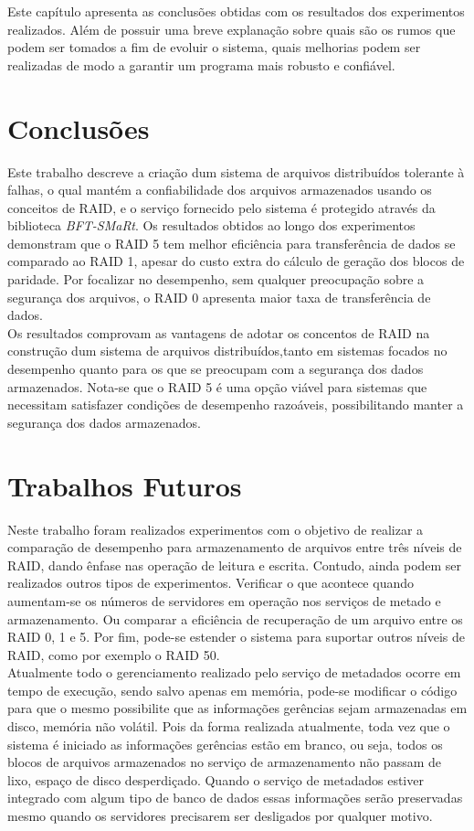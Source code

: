 Este capítulo apresenta as conclusões obtidas com os resultados dos experimentos realizados. Além de possuir uma breve explanação sobre quais são os rumos que podem ser tomados a fim de evoluir o sistema, quais melhorias podem ser realizadas de modo a garantir um programa mais robusto e confiável.
\\

\section{Conclusões}
Este trabalho descreve a criação dum sistema de arquivos distribuídos tolerante à falhas, o qual mantém a confiabilidade dos arquivos armazenados usando os conceitos de RAID, e o serviço fornecido pelo sistema é protegido através da biblioteca \textit{BFT-SMaRt}. Os resultados obtidos ao longo dos experimentos demonstram que o RAID 5 tem melhor eficiência para transferência de dados se comparado ao RAID 1, apesar do custo extra do cálculo de geração dos blocos de paridade. Por focalizar no desempenho, sem qualquer preocupação sobre a segurança dos arquivos, o RAID 0 apresenta maior taxa de transferência de dados.
\\

Os resultados comprovam as vantagens de adotar os concentos de RAID na construção dum sistema de arquivos distribuídos,tanto em sistemas focados no desempenho quanto para os que se preocupam com a segurança dos dados armazenados. Nota-se que o RAID 5 é uma opção viável para sistemas que necessitam satisfazer condições de desempenho razoáveis, possibilitando manter a segurança dos dados armazenados.
\\


\section{Trabalhos Futuros}
Neste trabalho foram realizados experimentos com o objetivo de realizar a comparação de desempenho para armazenamento de arquivos entre três níveis de RAID, dando ênfase nas operação de leitura e escrita. Contudo, ainda podem ser realizados outros tipos de experimentos. Verificar o que acontece quando aumentam-se os números de servidores em operação nos serviços de metado e armazenamento. Ou comparar a eficiência de recuperação de um arquivo entre os RAID 0, 1 e 5. Por fim, pode-se estender o sistema para suportar outros níveis de RAID, como por exemplo o RAID 50.
\\

Atualmente todo o gerenciamento realizado pelo serviço de metadados ocorre em tempo de execução, sendo salvo apenas em memória, pode-se modificar o código para que o mesmo possibilite que as informações gerências sejam armazenadas em disco, memória não volátil. Pois da forma realizada atualmente, toda vez que o sistema é iniciado as informações gerências estão em branco, ou seja, todos os blocos de arquivos armazenados no serviço de armazenamento não passam de lixo, espaço de disco desperdiçado. Quando o serviço de metadados estiver integrado com algum tipo de banco de dados essas informações serão preservadas mesmo quando os servidores precisarem ser desligados por qualquer motivo.
\\

